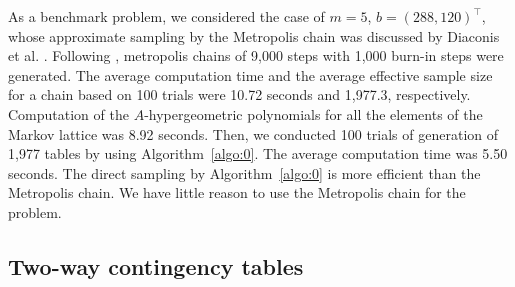 \documentclass[a4paper,12pt]{article}
\theoremstyle{plain}
\theoremstyle{remark}
\begin{document}
As a benchmark problem, we considered the case of
$m=5$, $b=(288,120)^\top$, whose approximate sampling by the
Metropolis chain was discussed by Diaconis et al. \cite{DES98}.
Following \cite{DES98}, metropolis chains of 9,000 steps with
1,000 burn-in steps were generated. The average computation time
and the average effective sample size for a chain based on 100
trials were 10.72 seconds and 1,977.3, respectively. Computation of
the $A$-hypergeometric polynomials for all the elements of
the Markov lattice was 8.92 seconds. Then, we conducted
100 trials of generation of 1,977 tables by using
Algorithm~\ref{algo:0}. The average computation time was 5.50
seconds. The direct sampling by Algorithm~\ref{algo:0}
is more efficient than the Metropolis chain. We have little
reason to use the Metropolis chain for the problem.

\subsection{Two-way contingency tables}
\end{document}

